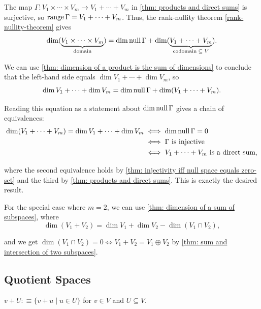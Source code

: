 \begin{prf}
  The map $\Gamma: V_1 \times \cdots \times V_m \to V_1 + \cdots + V_m$ in \ref{thm: products and direct sums} is surjective, so $\operatorname{range} \Gamma = V_1 + \cdots + V_m$. Thus, the rank-nullity theorem \ref{rank-nullity-theorem} gives
  \[
    \dim (\underbrace{V_1 \times \cdots \times V_m}_{\text{domain}}) = \dim \operatorname{null} \Gamma +  \dim(\underbrace{V_1 + \cdots + V_m}_{\text{codomain} \; \subseteq \; V}).
  \]

  We can use \ref{thm: dimension of a product is the sum of dimensions} to conclude that the left-hand side equals $\dim V_1 + \cdots + \dim V_m$, so
  \begin{equation}
    \dim V_1 + \cdots + \dim V_m = \dim \operatorname{null} \Gamma + \dim (V_1 + \cdots + V_m).
  \end{equation}

  Reading this equation as a statement about $\dim \operatorname{null} \Gamma$ gives a chain of equivalences:
  \begin{equation}
    \begin{aligned}
      \dim (V_1 + \cdots + V_m) = \dim V_1 + \cdots + \dim V_m
      & \iff \dim \operatorname{null} \Gamma = 0 \\
      & \iff \Gamma \text{ is injective} \\
      & \iff V_1 + \cdots + V_m \text{ is a direct sum,}
    \end{aligned}
  \end{equation}

  where the second equivalence holds by \ref{thm: injectivity iff null space equals zero-set} and the third by \ref{thm: products and direct sums}. This is exactly the desired result.

   For the special case where $m=2$, we can use \ref{thm: dimension of a sum of subspaces}, where
  \[
    \dim (V_1 + V_2) = \dim V_1 + \dim V_2 - \dim (V_1 \cap V_2),
  \]

  and we get $\dim (V_1 \cap V_2) = 0 \iff V_1 + V_2 = V_1 \oplus V_2$ by \ref{thm: sum and intersection of two subspaces}.
\end{prf}

\subsection{Quotient Spaces}

\setcounter{thm}{94}
\begin{mydef} [notation $v+U$]
  $v+U :\equiv \{v+u \mid u\in U\}$ for $v\in V$ and $U\subseteq V$.
\end{mydef}

